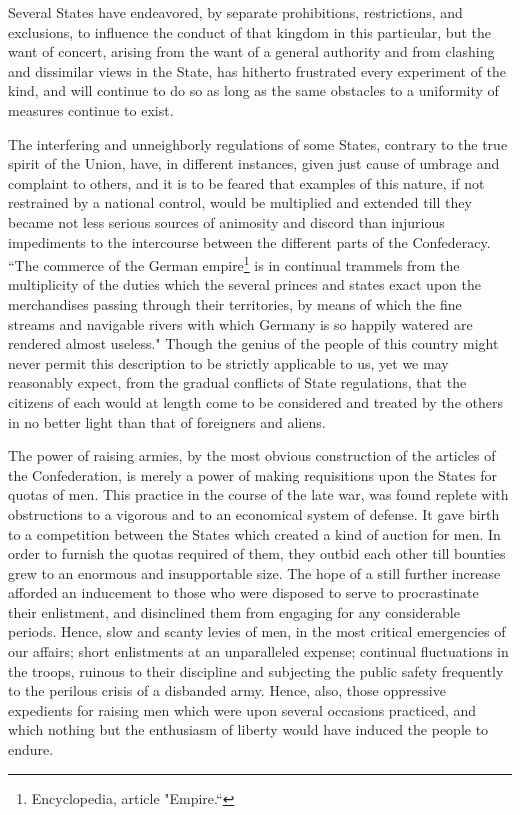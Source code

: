 Several States have endeavored, by separate prohibitions, restrictions, and exclusions, to influence the conduct of that kingdom in this particular, but the want of concert, arising from the want of a general authority and from clashing and dissimilar views in the State, has hitherto frustrated every experiment of the kind, and will continue to do so as long as the same obstacles to a uniformity of measures continue to exist.

The interfering and unneighborly regulations of some States, contrary to the true spirit of the Union, have, in different instances, given just cause of umbrage and complaint to others, and it is to be feared that examples of this nature, if not restrained by a national control, would be multiplied and extended till they became not less serious sources of animosity and discord than injurious impediments to the intercourse between the different parts of the Confederacy. 
``The commerce of the German empire\footnote{Encyclopedia, article "Empire.``} is in continual trammels from the multiplicity of the duties which the several princes and states exact upon the merchandises passing through their territories, by means of which the fine streams and navigable rivers with which Germany is so happily watered are rendered almost useless." Though the genius of the people of this country might never permit this description to be strictly applicable to us, yet we may reasonably expect, from the gradual conflicts of State regulations, that the citizens of each would at length come to be considered and treated by the others in no better light than that of foreigners and aliens.

The power of raising armies, by the most obvious construction of the articles of the Confederation, is merely a power of making requisitions upon the States for quotas of men. 
This practice in the course of the late war, was found replete with obstructions to a vigorous and to an economical system of defense. 
It gave birth to a competition between the States which created a kind of auction for men. 
In order to furnish the quotas required of them, they outbid each other till bounties grew to an enormous and insupportable size. 
The hope of a still further increase afforded an inducement to those who were disposed to serve to procrastinate their enlistment, and disinclined them from engaging for any considerable periods. 
Hence, slow and scanty levies of men, in the most critical emergencies of our affairs; short enlistments at an unparalleled expense; continual fluctuations in the troops, ruinous to their discipline and subjecting the public safety frequently to the perilous crisis of a disbanded army. 
Hence, also, those oppressive expedients for raising men which were upon several occasions practiced, and which nothing but the enthusiasm of liberty would have induced the people to endure.

